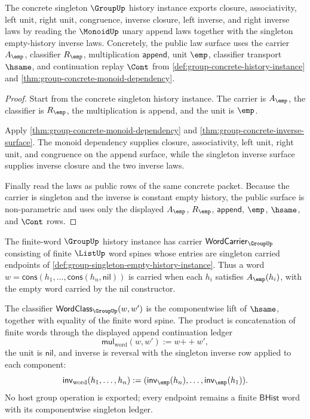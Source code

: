 \begin{theorem}
\label{thm:group-concrete-history-instance-public-laws}
The concrete singleton $\GroupUp$ history instance exports closure, associativity, left unit, right unit, congruence, inverse closure, left inverse, and right inverse laws by reading the $\MonoidUp$ unary append laws together with the singleton empty-history inverse laws. Concretely, the public law surface uses the carrier $A_{\emp}$, classifier $R_{\emp}$, multiplication $\mathsf{append}$, unit $\emp$, classifier transport $\hsame$, and continuation replay $\Cont$ from \autoref{def:group-concrete-history-instance} and \autoref{thm:group-concrete-monoid-dependency}.
\end{theorem}
\begin{proof}
Start from the concrete singleton history instance. The carrier is $A_{\emp}$, the classifier is $R_{\emp}$, the multiplication is append, and the unit is $\emp$.

Apply \autoref{thm:group-concrete-monoid-dependency} and \autoref{thm:group-concrete-inverse-surface}. The monoid dependency supplies closure, associativity, left unit, right unit, and congruence on the append surface, while the singleton inverse surface supplies inverse closure and the two inverse laws.

Finally read the laws as public rows of the same concrete packet. Because the carrier is singleton and the inverse is constant empty history, the public surface is non-parametric and uses only the displayed $A_{\emp}$, $R_{\emp}$, $\mathsf{append}$, $\emp$, $\hsame$, and $\Cont$ rows.
\end{proof}

\begin{definition}
\label{def:group-finite-word-history-instance}
The finite-word $\GroupUp$ history instance has carrier
$\mathsf{WordCarrier}_{\GroupUp}$ consisting of finite $\ListUp$ word spines
whose entries are singleton carried endpoints of
\autoref{def:group-singleton-empty-history-instance}. Thus a word
$w=\mathsf{cons}(h_1,\ldots,\mathsf{cons}(h_n,\mathsf{nil}))$ is carried when
each $h_i$ satisfies $A_{\emp}(h_i)$, with the empty word carried by the nil
constructor.

The classifier
$\mathsf{WordClass}_{\GroupUp}(w,w')$ is the componentwise lift of $\hsame$,
together with equality of the finite word spine. The product is concatenation
of finite words through the displayed append continuation ledger
$$
\mathsf{mul}_{\mathrm{word}}(w,w'):=w\mathbin{+\!\!+}w',
$$
the unit is $\mathsf{nil}$, and inverse is reversal with the singleton inverse
row applied to each component:
$$
\mathsf{inv}_{\mathrm{word}}(h_1,\ldots,h_n)
:=(\mathsf{inv}_{\emp}(h_n),\ldots,\mathsf{inv}_{\emp}(h_1)).
$$
No host group operation is exported; every endpoint remains a finite
$\mathsf{BHist}$ word with its componentwise singleton ledger.
\end{definition}

